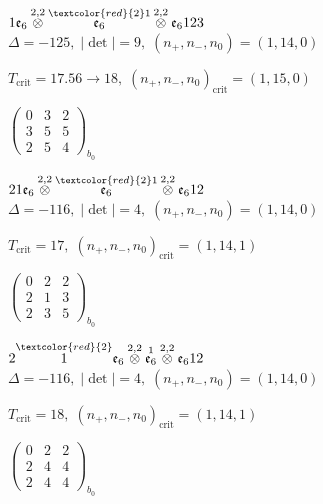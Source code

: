 \documentclass[10pt]{article}
\begin{document}
\smallskip

$1\mathfrak{e}_6\overset{2,2}{\otimes}\overset{\textcolor{red}{2}1}{\mathfrak{e}_6}\overset{2,2}{\otimes}\mathfrak{e}_6123$ \quad $\Delta=-125,\; |\det|=9,\; (n_+,n_-,n_0)=(1,14,0)$

\hspace{1em}$T_{\text{crit}}=17.56 \to 18,\; (n_+,n_-,n_0)_{\text{crit}}=(1,15,0)$

\hspace{2em}$\left(\begin{smallmatrix}0 & 3 & 2 \\ 3 & 5 & 5 \\ 2 & 5 & 4\end{smallmatrix}\right)_{\!b_0}$

\smallskip

$21\mathfrak{e}_6\overset{2,2}{\otimes}\overset{\textcolor{red}{2}1}{\mathfrak{e}_6}\overset{2,2}{\otimes}\mathfrak{e}_612$ \quad $\Delta=-116,\; |\det|=4,\; (n_+,n_-,n_0)=(1,14,0)$

\hspace{1em}$T_{\text{crit}}=17,\; (n_+,n_-,n_0)_{\text{crit}}=(1,14,1)$

\hspace{2em}$\left(\begin{smallmatrix}0 & 2 & 2 \\ 2 & 1 & 3 \\ 2 & 3 & 5\end{smallmatrix}\right)_{\!b_0}$

$2\overset{\textcolor{red}{2}}{1}\mathfrak{e}_6\overset{2,2}{\otimes}\overset{1}{\mathfrak{e}_6}\overset{2,2}{\otimes}\mathfrak{e}_612$ \quad $\Delta=-116,\; |\det|=4,\; (n_+,n_-,n_0)=(1,14,0)$

\hspace{1em}$T_{\text{crit}}=18,\; (n_+,n_-,n_0)_{\text{crit}}=(1,14,1)$

\hspace{2em}$\left(\begin{smallmatrix}0 & 2 & 2 \\ 2 & 4 & 4 \\ 2 & 4 & 4\end{smallmatrix}\right)_{\!b_0}$

\smallskip
\end{document}
